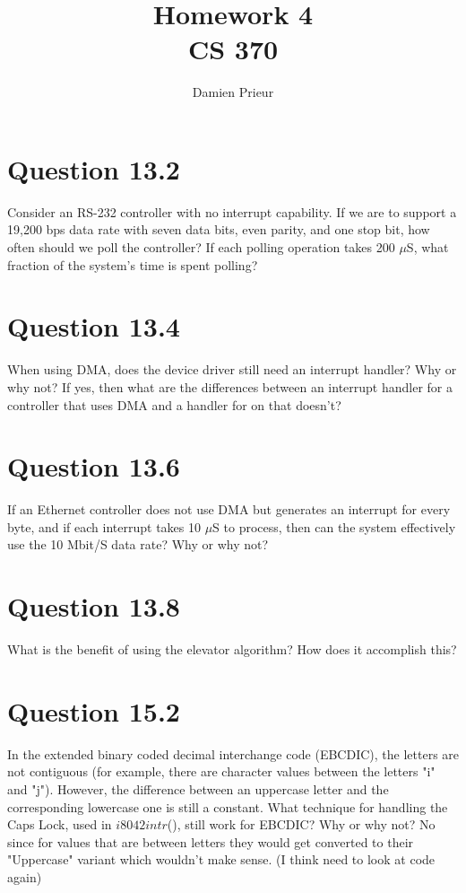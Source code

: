 \documentclass{article}
\author{Damien Prieur}
\title{Homework 4 \\ CS 370}
\date{}
\begin{document}
\maketitle

\section*{Question 13.2}
Consider an RS-232 controller with no interrupt capability.
If we are to support a 19,200 bps data rate with seven data bits, even parity, and one stop bit, how often should we poll the controller?
If each polling operation takes 200 $\mu$S, what fraction of the system's time is spent polling?
\newline

\section*{Question 13.4}
When using DMA, does the device driver still need an interrupt handler?
Why or why not?
If yes, then what are the differences between an interrupt handler for a controller that uses DMA and a handler for on that doesn't?
\newline

\section*{Question 13.6}
If an Ethernet controller does not use DMA but generates an interrupt for every byte, and if each interrupt takes 10 $\mu$S to process, then can the system effectively use the 10 Mbit/S data rate?
Why or why not?
\newline

\section*{Question 13.8}
What is the benefit of using the elevator algorithm?
How does it accomplish this?
\newline

\section*{Question 15.2}
In the extended binary coded decimal interchange code (EBCDIC), the letters are not contiguous
(for example, there are character values between the letters "i" and "j").
However, the difference between an uppercase letter and the corresponding lowercase one is still a constant.
What technique for handling the Caps Lock, used in $i8042intr$(), still work for EBCDIC?
Why or why not?
\newline
No since for values that are between letters they would get converted to their "Uppercase" variant which wouldn't make sense.
(I think need to look at code again)
\end{document}
